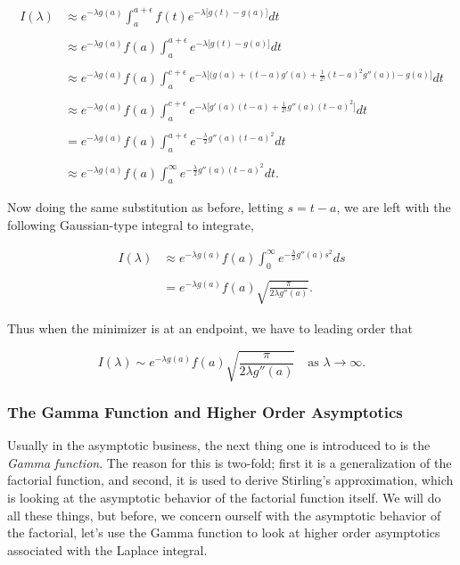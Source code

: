 \begin{align*}
I(\lambda) &\approx e^{-\lambda g(a)} \int_{a}^{a+\epsilon} f(t) e^{ -\lambda\big[ g(t) - g(a) \big] } dt \\ \\
	& \approx  e^{-\lambda g(a)} f(a) \int_{a}^{a+\epsilon} e^{ -\lambda\big[ g(t) - g(a) \big] } dt  \\  \\
	&\approx e^{-\lambda g(a)} f(a) \int_{a}^{c+\epsilon}  e^{ -\lambda\big[ \big( g(a) +(t-a)g'(a) + \frac{1}{2!} (t-a)^2 g''(a) \big) - g(a) \big] } dt \\ \\
	& \approx  e^{-\lambda g(a)} f(a) \int_{a}^{c+\epsilon} e^{ -\lambda\big[  g'(a)(t-a) + \frac{1}{2!}  g''(a)(t-a)^2 \big] } dt  \\  \\
	&= e^{-\lambda g(a)} f(a) \int_{a}^{a+\epsilon} e^{ - \frac{\lambda}{2}  g''(a)(t-a)^2 } dt  \\  \\
	&  \approx e^{-\lambda g(a)} f(a) \int_{a}^{\infty} e^{ - \frac{\lambda}{2}  g''(a)(t-a)^2 } dt.
\end{align*}

Now doing the same substitution as before, letting $s=t-a$, we are left with the following Gaussian-type integral to integrate,

\begin{align*}
I(\lambda) &\approx e^{-\lambda g(a)} f(a) \int_{0}^{\infty} e^{ - \frac{\lambda}{2}  g''(a)s^2 } ds  \\ \\
	&= e^{-\lambda g(a) } f(a) \sqrt{ \frac{\pi}{2\lambda g''(a) } }.
\end{align*}

Thus when the minimizer is at an endpoint, we have to leading order that 

\begin{equation}
\label{endpoint_laplace} I(\lambda) \sim  e^{-\lambda g(a) } f(a) \sqrt{ \frac{\pi}{2\lambda g''(a) } } \ \ \ \mbox{ as } \lambda\rightarrow\infty.
\end{equation}


%
%
\subsubsection{The Gamma Function and Higher Order Asymptotics}

Usually in the asymptotic business, the next thing one is introduced to is the \emph{Gamma function}. The reason for this is two-fold; first it is a generalization of the factorial function, and second, it is used to derive Stirling's approximation, which is looking at the asymptotic behavior of the factorial function itself. We will do all these things, but before, we concern ourself with the asymptotic behavior of the factorial, let's use the Gamma function to look at higher order asymptotics associated with the Laplace integral. 

